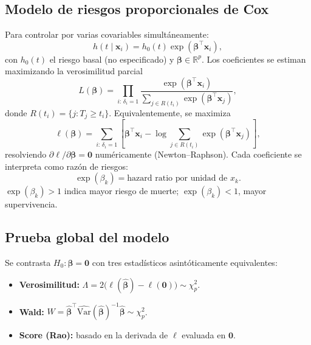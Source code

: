 \documentclass[12pt]{article}
\begin{document}
\subsection{Modelo de riesgos proporcionales de Cox}
Para controlar por varias covariables simultáneamente:
\begin{equation}
h(t \mid \mathbf{x}_i) = h_0(t) \exp(\boldsymbol{\beta}^\top \mathbf{x}_i),
\label{eq:cox}
\end{equation}
con $h_0(t)$ el riesgo basal (no especificado) y $\boldsymbol{\beta} \in \mathbb{R}^p$. Los coeficientes se estiman maximizando la verosimilitud parcial
\begin{equation}
L(\boldsymbol{\beta}) = \prod_{i:\, \delta_i = 1} \frac{\exp(\boldsymbol{\beta}^\top \mathbf{x}_i)}{\sum_{j \in R(t_i)} \exp(\boldsymbol{\beta}^\top \mathbf{x}_j)},
\end{equation}
donde $R(t_i) = \{j : T_j \ge t_i\}$. Equivalentemente, se maximiza
\[
\ell(\boldsymbol{\beta}) = \sum_{i:\, \delta_i = 1} \left[ \boldsymbol{\beta}^\top \mathbf{x}_i - \log \sum_{j \in R(t_i)} \exp(\boldsymbol{\beta}^\top \mathbf{x}_j) \right],
\]
resolviendo $\partial \ell / \partial \boldsymbol{\beta} = \mathbf{0}$ numéricamente (Newton--Raphson). Cada coeficiente se interpreta como razón de riesgos:
\[
\exp(\beta_k) = \text{hazard ratio por unidad de } x_k.
\]
$\exp(\beta_k) > 1$ indica mayor riesgo de muerte; $\exp(\beta_k) < 1$, mayor supervivencia.

\subsection{Prueba global del modelo}
Se contrasta $H_0: \boldsymbol{\beta} = \mathbf{0}$ con tres estadísticos asintóticamente equivalentes:
\begin{itemize}
\item \textbf{Verosimilitud:} $\Lambda = 2\bigl(\ell(\hat{\boldsymbol{\beta}}) - \ell(\mathbf{0})\bigr) \sim \chi^2_p$.
\item \textbf{Wald:} $W = \hat{\boldsymbol{\beta}}^\top \widehat{\mathrm{Var}}(\hat{\boldsymbol{\beta}})^{-1} \hat{\boldsymbol{\beta}} \sim \chi^2_p$.
\item \textbf{Score (Rao):} basado en la derivada de $\ell$ evaluada en $\mathbf{0}$.
\end{itemize}
\end{document}
